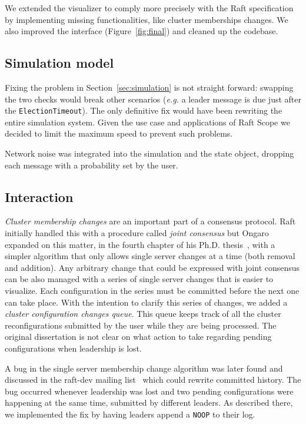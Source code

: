 We extended the visualizer to comply more precisely with the Raft specification
by implementing missing functionalities, like cluster memberships changes.
We also improved the interface (Figure~\ref{fig:final}) and cleaned up the codebase.

\subsection{Simulation model}
Fixing the problem in Section~\ref{sec:simulation} is not straight forward: swapping the two checks would
break other scenarios (\emph{e.g.} a leader message is due just after the \texttt{ElectionTimeout}).
The only definitive fix would have been rewriting the entire simulation system.
Given the use case and applications of Raft Scope we decided to limit the maximum speed to prevent such problems.

Network noise was integrated into the simulation and the state object, dropping each message with a probability
set by the user.

\subsection{Interaction}
\emph{Cluster membership changes} are an important part of a consensus protocol.
Raft initially handled this with a procedure called \emph{joint consensus}
but Ongaro expanded on this matter, in the fourth chapter of his Ph.D. thesis~\cite{ongaro2014consensus},
with a simpler algorithm that only allows single server changes at a time (both removal and addition).
Any arbitrary change that could be expressed with joint consensus
can be also managed with a series of single server changes that is easier to visualize.
Each configuration in the series must be committed before the next one can take place.
With the intention to clarify this series of changes, we added a \emph{cluster configuration changes queue}.
This queue keeps track of all the cluster reconfigurations submitted by the user while they are being processed.
The original dissertation is not clear on what action to take regarding pending configurations when leadership is lost.

A bug in the single server membership change algorithm was later found and discussed in the raft-dev mailing list~\cite{bug} which
could rewrite committed history. The bug occurred whenever leadership was lost and two pending configurations were happening
at the same time, submitted by different leaders. As described there, we implemented the fix by having leaders append a \texttt{NOOP} to their log.

